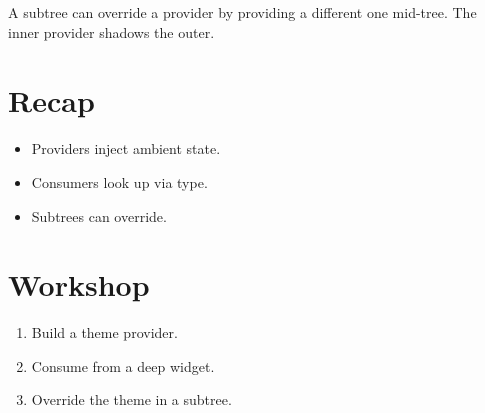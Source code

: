 A subtree can override a provider by providing a different
one mid-tree. The inner provider shadows the outer.

\section{Recap}

\begin{recap}
\begin{itemize}[leftmargin=*]
  \item Providers inject ambient state.
  \item Consumers look up via type.
  \item Subtrees can override.
\end{itemize}
\end{recap}

\section*{Workshop}

\begin{enumerate}[leftmargin=*]
  \item Build a theme provider.
  \item Consume from a deep widget.
  \item Override the theme in a subtree.
\end{enumerate}
